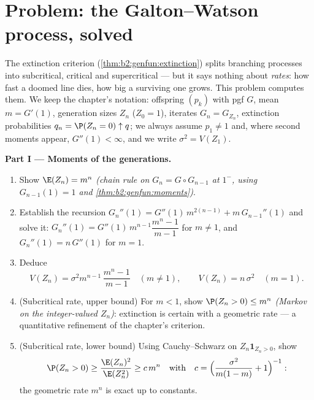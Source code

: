 \section{Problem: the Galton--Watson process, solved}

\begin{problem}\label{pb:b2:genfun:1}
The extinction criterion (\cref{thm:b2:genfun:extinction})
splits branching processes into
subcritical, critical and supercritical --- but it says
nothing about \emph{rates}: how fast a doomed line dies, how
big a surviving one grows. This problem computes them. We keep
the chapter's notation: offspring  $(p_k)$ with pgf $G$,
mean $m = G'(1)$, generation sizes $Z_n$ ($Z_0 = 1$), iterates
$G_n = G_{Z_n}$, extinction probabilities $q_n = \P(Z_n = 0)
\uparrow q$; we always assume $p_1 \neq 1$ and, where second
moments appear, $G''(1) < \infty$, and we write $\sigma^2 =
V(Z_1)$.

\medskip
\noindent\textbf{Part I --- Moments of the generations.}
\begin{enumerate}
  \item Show $\E(Z_n) = m^n$ \emph{(chain rule on $G_n = G
        \circ G_{n-1}$ at $1^-$, using $G_{n-1}(1) = 1$ and
        \cref{thm:b2:genfun:moments})}.
  \item Establish the recursion $G_n''(1) =
        G''(1)\,m^{2(n-1)} + m\,G_{n-1}''(1)$ and solve it:
        $G_n''(1) = G''(1)\,m^{n-1}\dfrac{m^n - 1}{m - 1}$
        for $m \neq 1$, and $G_n''(1) = n\,G''(1)$ for $m =
        1$.
  \item Deduce
        \[
        V(Z_n) = \sigma^2m^{n-1}\,\frac{m^n - 1}{m - 1}
        \quad (m \neq 1),
        \qquad
        V(Z_n) = n\,\sigma^2 \quad (m = 1).
        \]
  \item (Subcritical rate, upper bound) For $m < 1$, show
        $\P(Z_n > 0) \leq m^n$ \emph{(Markov on the
        integer-valued $Z_n$)}: extinction is certain with a
        geometric rate --- a quantitative refinement of the
        chapter's criterion.
  \item (Subcritical rate, lower bound) Using
        Cauchy--Schwarz on $Z_n\mathbf 1_{Z_n > 0}$, show
        \[
        \P(Z_n > 0) \geq \frac{\E(Z_n)^2}{\E(Z_n^2)}
        \geq c\,m^{n}
        \quad\text{with}\quad
        c = \Bigl(\frac{\sigma^2}{m(1-m)} + 1\Bigr)^{-1} :
        \]
        the geometric rate $m^n$ is exact up to constants.
\end{enumerate}


\end{problem}
